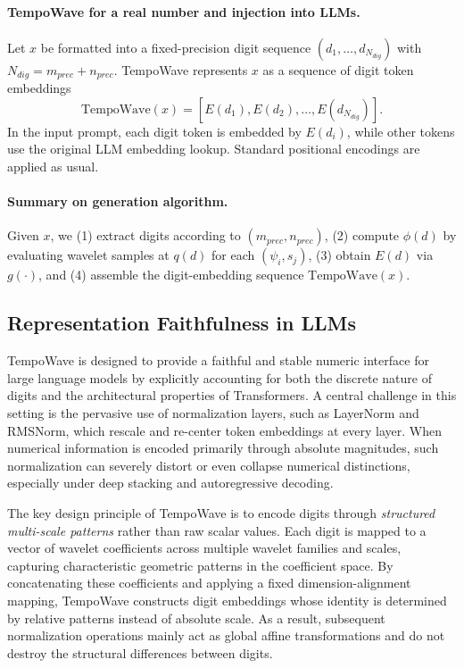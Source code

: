 \documentclass{article}
\begin{document}
\paragraph{TempoWave for a real number and injection into LLMs.}
Let $x$ be formatted into a fixed-precision digit sequence $(d_1,\ldots,d_{N_{dig}})$ with $N_{dig}=m_{prec}+n_{prec}$. TempoWave represents $x$ as a sequence of digit token embeddings
\begin{equation}
\mathrm{TempoWave}(x) = \left[E(d_1), E(d_2), \ldots, E(d_{N_{dig}})\right].
\label{eq:TempoWave_number_seq_main}
\end{equation}
In the input prompt, each digit token is embedded by $E(d_i)$, while other tokens use the original LLM embedding lookup. Standard positional encodings are applied as usual.

\paragraph{Summary on generation algorithm.}
 Given $x$, we (1) extract digits according to $(m_{prec},n_{prec})$, (2) compute $\phi(d)$ by evaluating wavelet samples at $q(d)$ for each $(\psi_i,s_j)$, (3) obtain $E(d)$ via $g(\cdot)$, and (4) assemble the digit-embedding sequence $\mathrm{TempoWave}(x)$.

\subsection{Representation Faithfulness in LLMs}
\label{sec:TempoWave_theory}

TempoWave is designed to provide a faithful and stable numeric interface for large language models by explicitly accounting for both the discrete nature of digits and the architectural properties of Transformers.
A central challenge in this setting is the pervasive use of normalization layers, such as LayerNorm and RMSNorm, which rescale and re-center token embeddings at every layer.
When numerical information is encoded primarily through absolute magnitudes, such normalization can severely distort or even collapse numerical distinctions, especially under deep stacking and autoregressive decoding.

The key design principle of TempoWave is to encode digits through \emph{structured multi-scale patterns} rather than raw scalar values.
Each digit is mapped to a vector of wavelet coefficients across multiple wavelet families and scales, capturing characteristic geometric patterns in the coefficient space.
By concatenating these coefficients and applying a fixed dimension-alignment mapping, TempoWave constructs digit embeddings whose identity is determined by relative patterns instead of absolute scale.
As a result, subsequent normalization operations mainly act as global affine transformations and do not destroy the structural differences between digits.
\end{document}
